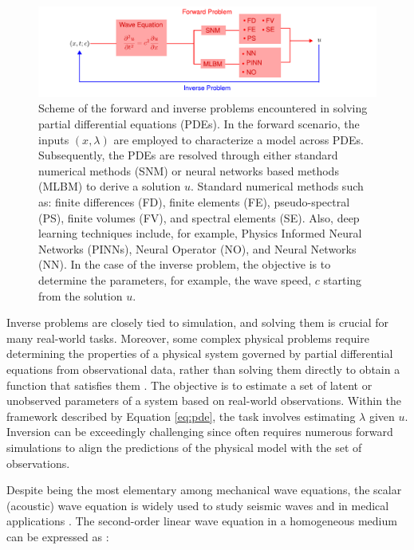 \documentclass[11pt,twoside]{article}
\begin{document}
\begin{figure}[H]
\includegraphics{figs/Forward_Inverse_Modeling_Waves.pdf}
    \caption{Scheme of the forward and inverse problems encountered in solving partial differential equations (PDEs). In the forward 
    scenario, the inputs $(x,\lambda)$ are employed to characterize a model across PDEs. Subsequently, the PDEs are resolved through 
    either standard numerical methods (SNM) or neural networks based methods (MLBM) to derive a solution $u$. Standard numerical 
    methods such as: finite differences (FD), finite elements (FE), pseudo-spectral (PS), finite volumes (FV), and spectral 
    elements (SE). Also, deep learning techniques include, for example, Physics Informed Neural Networks (PINNs), Neural Operator 
    (NO), and Neural Networks (NN). In the case of the inverse problem, the objective is to determine the parameters, for example, 
    the wave speed, $c$ starting from the solution $u$.}
    \label{fig:forward_inverse}
\end{figure}

Inverse problems are closely tied to simulation, and solving them is crucial for many real-world tasks. Moreover, some complex physical 
problems require determining the properties of a physical system governed by partial differential equations from observational data, 
rather than solving them directly to obtain a function that satisfies them 
\citep{galiounas_battery_2022, ren_seismicnet_2024,mccann_convolutional_2017}. The objective is to estimate a set of latent or 
unobserved parameters of a system based on real-world observations. Within the framework described by Equation \ref{eq:pde}, 
the task involves estimating $\lambda$ given $u$. Inversion can be exceedingly challenging since often requires numerous forward 
simulations to align the predictions of the physical model with the set of observations. 

Despite being the most elementary among mechanical wave equations, the scalar (acoustic) wave equation is widely used to study seismic 
waves and in medical applications \citep{moseley_physics-informed_2022, alkhadhr_wave_2023}. The second-order linear wave equation in a 
homogeneous medium can be expressed as \citep{Carcione2002}:
\end{document}
